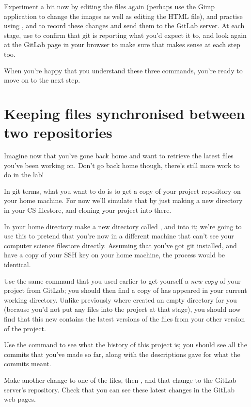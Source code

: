 Experiment a bit now by editing the files again (perhaps use the Gimp application to change the images as well as editing the HTML file), and practise using ,  and  to record these changes and send them to the GitLab server. At each stage, use  to confirm that git is reporting what you'd expect it to, and look again at the GitLab page in your browser to make sure that makes sense at each step too. 

When you're happy that you understand these three commands, you're ready to move on to the next step.

\section{Keeping files synchronised between two repositories}
Imagine now that you've gone back home and want to retrieve the latest files you've been working on. Don't go back home though, there's still more work to do in the lab! 

In git terms, what you want to do is to get a copy of your project repository on your home machine. For now we'll simulate that by just making a new directory in your CS filestore, and cloning your project into there. 

In your home directory make a new directory called , and  into it; we're going to use this to pretend that you're now in a different machine that can't see your computer science filestore directly. Assuming that you've got git installed, and have a copy of your SSH key on your home machine, the process would be identical.

Use the same  command that you used earlier to get yourself a \emph{new copy} of your  project from GitLab; you should then find a copy of  has appeared in your current working directory. Unlike previously where  created an empty directory for you (because you'd not put any files into the project at that stage), you should now find that this new  contains the latest versions of the files from your other version of the project.

Use the  command to see what the history of this project is; you should see all the commits that you've made so far, along with the descriptions gave for what the commits meant. 

Make another change to one of the files, then ,  and  that change to the GitLab server's repository. Check that you can see these latest changes in the GitLab web pages.

